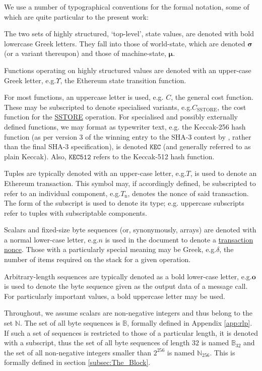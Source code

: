 \documentclass[9pt,oneside]{amsart}
\makeatletter
\newcommand*\eg{e.g.\@\xspace}
\makeatother
\begin{document}
\begin{multicols}{2}
We use a number of typographical conventions for the formal notation, some of which are quite particular to the present work:

The two sets of highly structured, `top-level', state values, are denoted with bold lowercase Greek letters. They fall into those of world-state, which are denoted $\boldsymbol{\sigma}$ (or a variant thereupon) and those of machine-state, $\boldsymbol{\mu}$.

Functions operating on highly structured values are denoted with an upper-case Greek letter, \eg \hyperlink{Upsilon_state_transition}{$\Upsilon$}, the Ethereum state transition function.

For most functions, an uppercase letter is used, e.g. $C$, the general cost function. These may be subscripted to denote specialised variants, \eg \hyperlink{C__SSTORE}{$C_\text{SSTORE}$}, the cost function for the \hyperlink{SSTORE}{{\tiny SSTORE}} operation. For specialised and possibly externally defined functions, we may format as typewriter text, \eg the Keccak-256 hash function (as per version 3 of the winning entry to the SHA-3 contest by \cite{Keccak}, rather than the final SHA-3 specification), is denoted $\texttt{KEC}$ (and generally referred to as plain Keccak). Also, $\texttt{KEC512}$ refers to the Keccak-512 hash function.

Tuples are typically denoted with an upper-case letter, \eg $T$, is used to denote an Ethereum transaction. This symbol may, if accordingly defined, be subscripted to refer to an individual component, \eg \hyperlink{transaction_nonce}{$T_{\mathrm{n}}$}, denotes the nonce of said transaction. The form of the subscript is used to denote its type; \eg uppercase subscripts refer to tuples with subscriptable components.

Scalars and fixed-size byte sequences (or, synonymously, arrays) are denoted with a normal lower-case letter, \eg $n$ is used in the document to denote a \hyperlink{transaction_nonce}{transaction nonce}. Those with a particularly special meaning may be Greek, \eg $\delta$, the number of items required on the stack for a given operation.

Arbitrary-length sequences are typically denoted as a bold lower-case letter, \eg $\mathbf{o}$ is used to denote the byte sequence given as the output data of a message call. For particularly important values, a bold uppercase letter may be used.

Throughout, we assume scalars are non-negative integers and thus belong to the set $\mathbb{N}$. The set of all byte sequences is $\mathbb{B}$, formally defined in Appendix \ref{app:rlp}. If such a set of sequences is restricted to those of a particular length, it is denoted with a subscript, thus the set of all byte sequences of length $32$ is named $\mathbb{B}_{32}$ and the set of all non-negative integers smaller than $2^{256}$ is named $\mathbb{N}_{256}$. This is formally defined in section \hyperlink{block}{\ref{subsec:The_Block}}.


\end{multicols}
\end{document}
